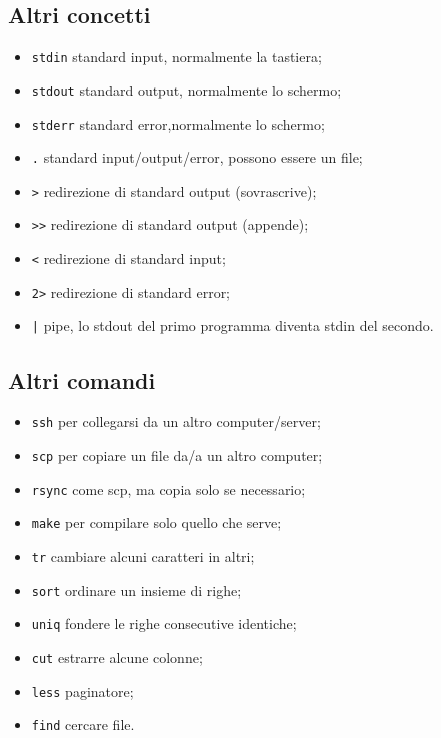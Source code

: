 \begin{multicols}{2}
\subsection{Altri concetti}
\begin{itemize}
	\item \texttt{stdin} standard input, normalmente la tastiera;
	\item \texttt{stdout} standard output, normalmente lo schermo;
	\item \texttt{stderr} standard error,normalmente lo schermo;
	\item \texttt{.} standard input/output/error, possono essere un file;
	\item \texttt{>} redirezione di standard output (sovrascrive);
	\item \texttt{>>} redirezione di standard output (appende);
	\item \texttt{<} redirezione di standard input;
	\item \texttt{2>} redirezione di standard error;
	\item \texttt{|} pipe, lo stdout del primo programma diventa stdin del secondo.
\end{itemize}

\subsection{Altri comandi}
\begin{itemize}
	\item \texttt{ssh} per collegarsi da un altro computer/server;
	\item \texttt{scp} per copiare un file da/a un altro computer;
	\item \texttt{rsync} come scp, ma copia solo se necessario;
	\item \texttt{make} per compilare solo quello che serve;
	\item \texttt{tr} cambiare alcuni caratteri in altri;
	\item \texttt{sort} ordinare un insieme di righe;
	\item \texttt{uniq} fondere le righe consecutive identiche;
	\item \texttt{cut} estrarre alcune colonne;
	\item \texttt{less} paginatore;
	\item \texttt{find} cercare file.
\end{itemize}

\end{multicols}